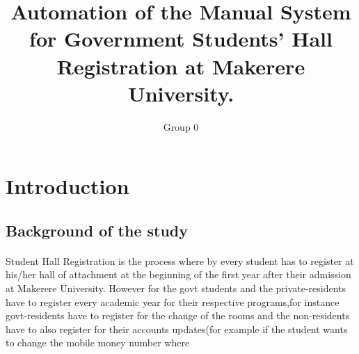 \documentclass[12pt]{article}
\begin{document}
	\title{Automation of the Manual System for Government Students’ Hall Registration at Makerere University.}
	
	\author{Group 0}
	
	\maketitle
	\section{Introduction}
	\subsection{Background of the study}
	\paragraph{}
	Student Hall Registration is the process where by every student has to register at his/her hall of attachment at the beginning of the first year after their admission at Makerere University.
	However for the govt students and the private-residents have to register every academic year for their respective programs,for instance govt-residents have to register for the change of the rooms and the non-residents have to also register for their accounts updates(for example if the student wants to change the mobile money number where
\end{document}
